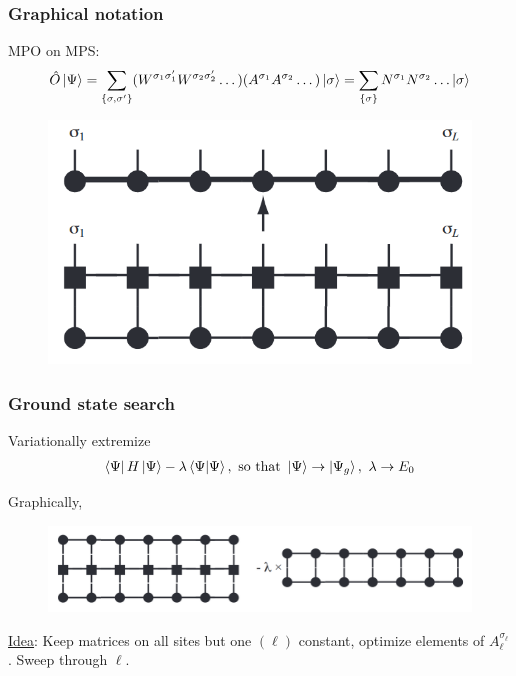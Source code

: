 \documentclass{beamer}
\theoremstyle{definition}
\begin{document}
\begin{frame}
	\frametitle{Graphical notation}
	MPO on MPS:
	\begin{align*}
		\hat{O}\ket{\Psi} 
		= \sum_{\{\sigma,\sigma'\}} (W^{\sigma_1\sigma_1'}W^{\sigma_2\sigma_2'}\dots)(A^{\sigma_1}A^{\sigma_2}\dots) \ket{\sigma} 
		= \sum_{\{\sigma\}} N^{\sigma_1}N^{\sigma_2}\dots \ket{\sigma}
 	\end{align*}
 	\begin{figure}[!htb]
 		\centering
 		\includegraphics[scale=0.3]{mpo_on_mps.png}
 	\end{figure}
\end{frame}




\begin{frame}
	\frametitle{Ground state search}
	Variationally extremize 
	\begin{align*}
		\bra{\Psi} H \ket{\Psi} - \lambda \braket{\Psi}, \text{ so that }  \ket{\Psi} \to \ket{\Psi_g},\,\, \lambda \to E_0
	\end{align*}

	
	\vspace{10pt}
	
	\pause
	
	Graphically,
	\begin{figure}[!htb]
		\centering
		\includegraphics[scale=0.3]{gnd_state_search.png}
	\end{figure}
	\underline{Idea}: Keep matrices on all sites but one $(\ell)$ constant, optimize elements of $A^{\sigma_\ell}_{\ell}$. Sweep through $\ell$.
\end{frame}
\end{document}
